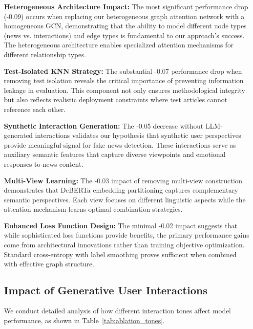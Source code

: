 \textbf{Heterogeneous Architecture Impact:} The most significant performance drop (-0.09) occurs when replacing our heterogeneous graph attention network with a homogeneous GCN, demonstrating that the ability to model different node types (news vs. interactions) and edge types is fundamental to our approach's success. The heterogeneous architecture enables specialized attention mechanisms for different relationship types.

\textbf{Test-Isolated KNN Strategy:} The substantial -0.07 performance drop when removing test isolation reveals the critical importance of preventing information leakage in evaluation. This component not only ensures methodological integrity but also reflects realistic deployment constraints where test articles cannot reference each other.

\textbf{Synthetic Interaction Generation:} The -0.05 decrease without LLM-generated interactions validates our hypothesis that synthetic user perspectives provide meaningful signal for fake news detection. These interactions serve as auxiliary semantic features that capture diverse viewpoints and emotional responses to news content.

\textbf{Multi-View Learning:} The -0.03 impact of removing multi-view construction demonstrates that DeBERTa embedding partitioning captures complementary semantic perspectives. Each view focuses on different linguistic aspects while the attention mechanism learns optimal combination strategies.

\textbf{Enhanced Loss Function Design:} The minimal -0.02 impact suggests that while sophisticated loss functions provide benefits, the primary performance gains come from architectural innovations rather than training objective optimization. Standard cross-entropy with label smoothing proves sufficient when combined with effective graph structure.

\subsection{Impact of Generative User Interactions}

We conduct detailed analysis of how different interaction tones affect model performance, as shown in Table~\ref{tab:ablation_tones}.

